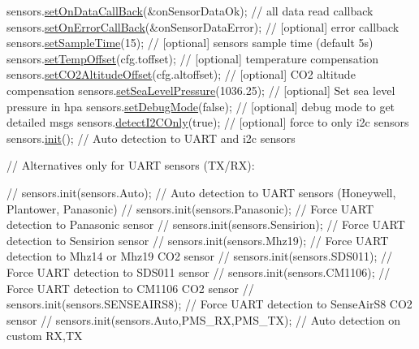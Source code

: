 \begin{DoxyCode}
    sensors.\hyperlink{classSensors_a729f911e0508cc8814a2276ff519b219}{setOnDataCallBack}(&onSensorDataOk);     \textcolor{comment}{// all data read callback}
    sensors.\hyperlink{classSensors_aba1b7a633d1d89514c891220b603351f}{setOnErrorCallBack}(&onSensorDataError); \textcolor{comment}{// [optional] error callback}
    sensors.\hyperlink{classSensors_ac723c0d9cf5af5daa0fa8d041f41f3d8}{setSampleTime}(15);                      \textcolor{comment}{// [optional] sensors sample time (default
       5s)}
    sensors.\hyperlink{classSensors_a122c0d2922d2a80984e8a3ac21b883c3}{setTempOffset}(cfg.toffset);             \textcolor{comment}{// [optional] temperature compensation}
    sensors.\hyperlink{classSensors_a27eec756609a421b3927c0dc132ae7c6}{setCO2AltitudeOffset}(cfg.altoffset);    \textcolor{comment}{// [optional] CO2 altitude
       compensation}
    sensors.\hyperlink{classSensors_a8fe6e43b99919f6c481792f0c0de8c50}{setSeaLevelPressure}(1036.25);           \textcolor{comment}{// [optional] Set sea level pressure
       in hpa}
    sensors.\hyperlink{classSensors_ac749e2c2618a177afa7d72ce68573fa5}{setDebugMode}(\textcolor{keyword}{false});                    \textcolor{comment}{// [optional] debug mode to get detailed
       msgs}
    sensors.\hyperlink{classSensors_ae25465fbd64d3b2b9ae31e2cb5a4b246}{detectI2COnly}(\textcolor{keyword}{true});                    \textcolor{comment}{// [optional] force to only i2c sensors}
    sensors.\hyperlink{classSensors_a019efdf3e65081e9ace94e1f05338e4b}{init}();                                 \textcolor{comment}{// Auto detection to UART and i2c sensors}

    \textcolor{comment}{// Alternatives only for UART sensors (TX/RX):}

    \textcolor{comment}{// sensors.init(sensors.Auto);                  // Auto detection to UART sensors (Honeywell,
       Plantower, Panasonic)}
    \textcolor{comment}{// sensors.init(sensors.Panasonic);             // Force UART detection to Panasonic sensor}
    \textcolor{comment}{// sensors.init(sensors.Sensirion);             // Force UART detection to Sensirion sensor}
    \textcolor{comment}{// sensors.init(sensors.Mhz19);                 // Force UART detection to Mhz14 or Mhz19 CO2 sensor}
    \textcolor{comment}{// sensors.init(sensors.SDS011);                // Force UART detection to SDS011 sensor}
    \textcolor{comment}{// sensors.init(sensors.CM1106);                // Force UART detection to CM1106 CO2 sensor}
    \textcolor{comment}{// sensors.init(sensors.SENSEAIRS8);            // Force UART detection to SenseAirS8 CO2 sensor}
    \textcolor{comment}{// sensors.init(sensors.Auto,PMS\_RX,PMS\_TX);    // Auto detection on custom RX,TX}



\end{DoxyCode}
